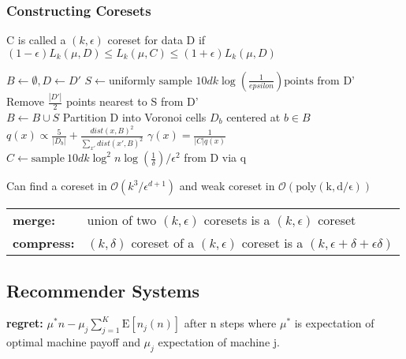 \documentclass[7pt,parskip]{scrartcl}
\newcommand{\E}{\textrm{E}}
\begin{document}
\begin{multicols*}{3}
\subsubsection{Constructing Coresets} %
\label{ssub:constructing_coresets}
C is called a $(k,\epsilon)$ coreset for data D if \\
$(1-\epsilon)L_k(\mu,D) \leq L_k(\mu,C) \leq (1+\epsilon)L_k(\mu,D)$

\begin{mdframed}
	\begin{algorithmic}
 		\State $B \gets \emptyset, D \gets D'$
			\State $S \gets \textrm{uniformly sample } 10dk \log(\frac{1}{epsilon}) \textrm{points from D'}$ \\
			\State Remove $\frac{|D'|}{2}$ points nearest to S from D' \\
			\State $B \gets B \cup S$
		\EndWhile
		\State Partition D into Voronoi cells $D_b$ centered at $b \in B$ \\
		$q(x)\propto \frac{5}{|D_b|} + \frac{dist(x,B)^2}{\sum_{x'}dist(x',B)^2}$ \qquad $\gamma(x) = \frac{1}{|C|q(x)}$ \\
		\State $C \gets \mathrm{sample} \ 10dk \log^2 n \log(\frac{1}{\delta})/\epsilon^2$ from D via q 
 	\end{algorithmic}
\end{mdframed}

Can find a coreset in $\mathcal{O}(k^3/\epsilon^{d+1})$ and weak coreset in $\mathcal{O}(\mathrm{poly(k,d/\epsilon)})$ \\
\begin{tabular}{l l}
\textbf{merge:} & union of two $(k,\epsilon)$ coresets is a $(k,\epsilon)$ coreset \\
\textbf{compress:} & $(k,\delta)$ coreset of a $(k,\epsilon)$ coreset is a $(k,\epsilon + \delta + \epsilon \delta)$
\end{tabular}

\subsection{Recommender Systems} %
\label{sub:recommenders}
\textbf{regret: } $\mu^\ast n - \mu_j \sum_{j=1}^K \E[n_j(n)]$ after n steps where $\mu^\ast$ is expectation of optimal machine payoff and $\mu_j$ expectation of machine j.

\end{multicols*}
\end{document}
